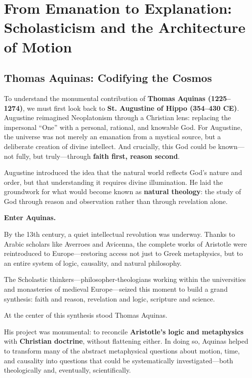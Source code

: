\section{From Emanation to Explanation: Scholasticism and the Architecture of Motion}

\subsection{Thomas Aquinas: Codifying the Cosmos}

To understand the monumental contribution of \textbf{Thomas Aquinas (1225–1274)}, we must first look back to \textbf{St. Augustine of Hippo (354–430 CE)}. Augustine reimagined Neoplatonism through a Christian lens: replacing the impersonal ``One'' with a personal, rational, and knowable God. For Augustine, the universe was not merely an emanation from a mystical source, but a deliberate creation of divine intellect. And crucially, this God could be known—not fully, but truly—through \textbf{faith first, reason second}.

Augustine introduced the idea that the natural world reflects God's nature and order, but that understanding it requires divine illumination. He laid the groundwork for what would become known as \textbf{natural theology}: the study of God through reason and observation rather than through revelation alone.

\textbf{Enter Aquinas.}

By the 13th century, a quiet intellectual revolution was underway. Thanks to Arabic scholars like Averroes and Avicenna, the complete works of Aristotle were reintroduced to Europe—restoring access not just to Greek metaphysics, but to an entire system of logic, causality, and natural philosophy. 

The Scholastic thinkers—philosopher-theologians working within the universities and monasteries of medieval Europe—seized this moment to build a grand synthesis: faith and reason, revelation and logic, scripture and science.

At the center of this synthesis stood Thomas Aquinas.

His project was monumental: to reconcile \textbf{Aristotle’s logic and metaphysics} with \textbf{Christian doctrine}, without flattening either. In doing so, Aquinas helped to transform many of the abstract metaphysical questions about motion, time, and causality into questions that could be systematically investigated—both theologically and, eventually, scientifically.


